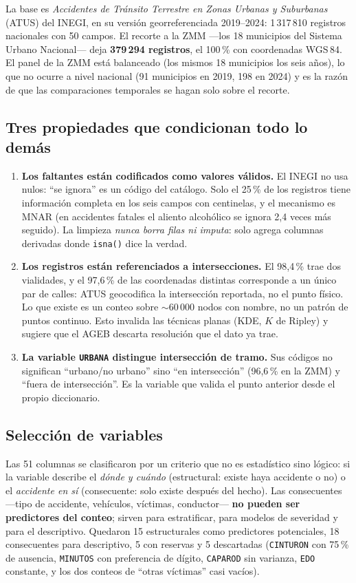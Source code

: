 \documentclass[11pt,a4paper]{article}
\begin{document}
La base es \emph{Accidentes de Tránsito Terrestre en Zonas Urbanas y
Suburbanas} (ATUS) del INEGI, en su versión georreferenciada 2019--2024:
1\,317\,810 registros nacionales con 50 campos. El recorte a la ZMM —los 18
municipios del Sistema Urbano Nacional— deja \textbf{379\,294 registros}, el
100\,\% con coordenadas WGS\,84. El panel de la ZMM está balanceado (los mismos
18 municipios los seis años), lo que no ocurre a nivel nacional (91 municipios
en 2019, 198 en 2024) y es la razón de que las comparaciones temporales se
hagan solo sobre el recorte.

\subsection{Tres propiedades que condicionan todo lo demás}

\begin{enumerate}[leftmargin=1.4em]
\item \textbf{Los faltantes están codificados como valores válidos.} El INEGI
  no usa nulos: ``se ignora'' es un código del catálogo. Solo el 25\,\% de los
  registros tiene información completa en los seis campos con centinelas, y el
  mecanismo es MNAR (en accidentes fatales el aliento alcohólico se ignora
  2,4 veces más seguido). La limpieza \emph{nunca borra filas ni imputa}: solo
  agrega columnas derivadas donde \texttt{isna()} dice la verdad.
\item \textbf{Los registros están referenciados a intersecciones.} El 98,4\,\%
  trae dos vialidades, y el 97,6\,\% de las coordenadas distintas corresponde a
  un único par de calles: ATUS geocodifica la intersección reportada, no el
  punto físico. Lo que existe es un conteo sobre $\sim$60\,000 nodos con
  nombre, no un patrón de puntos continuo. Esto invalida las técnicas planas
  (KDE, $K$ de Ripley) y sugiere que el AGEB descarta resolución que el dato ya
  trae.
\item \textbf{La variable \texttt{URBANA} distingue intersección de tramo.}
  Sus códigos no significan ``urbano/no urbano'' sino ``en intersección'' (96,6\,\%
  en la ZMM) y ``fuera de intersección''. Es la variable que valida el punto
  anterior desde el propio diccionario.
\end{enumerate}

\subsection{Selección de variables}

Las 51 columnas se clasificaron por un criterio que no es estadístico sino
lógico: si la variable describe el \emph{dónde y cuándo} (estructural: existe
haya accidente o no) o el \emph{accidente en sí} (consecuente: solo existe
después del hecho). Las consecuentes —tipo de accidente, vehículos, víctimas,
conductor— \textbf{no pueden ser predictores del conteo}; sirven para
estratificar, para modelos de severidad y para el descriptivo. Quedaron 15
estructurales como predictores potenciales, 18 consecuentes para descriptivo, 5
con reservas y 5 descartadas (\texttt{CINTURON} con 75\,\% de ausencia,
\texttt{MINUTOS} con preferencia de dígito, \texttt{CAPAROD} sin varianza,
\texttt{EDO} constante, y los dos conteos de ``otras víctimas'' casi vacíos).
\end{document}
